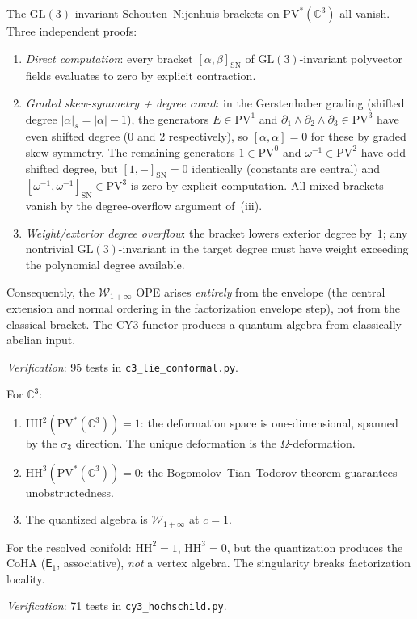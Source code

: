 \documentclass[11pt]{article}
\newcommand{\cW}{\mathcal{W}}
\newcommand{\C}{\mathbb{C}}
\newcommand{\Eone}{\mathsf{E}_1}
\newcommand{\HH}{\mathrm{HH}}
\begin{document}
\begin{theorem}
\label{wn:thm:c3-abelian-bracket}
The $\mathrm{GL}(3)$-invariant Schouten--Nijenhuis brackets on $\mathrm{PV}^*(\C^3)$ all vanish. Three independent proofs:
\begin{enumerate}[label=\textup{(\roman*)}]
 \item \emph{Direct computation}: every bracket $[\alpha, \beta]_{\mathrm{SN}}$ of $\mathrm{GL}(3)$-invariant polyvector fields evaluates to zero by explicit contraction.
 \item \emph{Graded skew-symmetry + degree count}: in the Gerstenhaber grading (shifted degree $|\alpha|_s = |\alpha| - 1$), the generators $E \in \mathrm{PV}^1$ and $\partial_1 \wedge \partial_2 \wedge \partial_3 \in \mathrm{PV}^3$ have even shifted degree ($0$ and $2$ respectively), so $[\alpha, \alpha] = 0$ for these by graded skew-symmetry. The remaining generators $1 \in \mathrm{PV}^0$ and $\omega^{-1} \in \mathrm{PV}^2$ have odd shifted degree, but $[1, -]_{\mathrm{SN}} = 0$ identically (constants are central) and $[\omega^{-1}, \omega^{-1}]_{\mathrm{SN}} \in \mathrm{PV}^3$ is zero by explicit computation. All mixed brackets vanish by the degree-overflow argument of~(iii).
 \item \emph{Weight/exterior degree overflow}: the bracket lowers exterior degree by~$1$; any nontrivial $\mathrm{GL}(3)$-invariant in the target degree must have weight exceeding the polynomial degree available.
\end{enumerate}
Consequently, the $\cW_{1+\infty}$ OPE arises \emph{entirely} from the envelope (the central extension and normal ordering in the factorization envelope step), not from the classical bracket. The CY3 functor produces a quantum algebra from classically abelian input.

\noindent\textit{Verification}: 95 tests in \texttt{c3\_lie\_conformal.py}.
\end{theorem}

\begin{theorem}
\label{wn:thm:c3-hochschild}
For $\C^3$:
\begin{enumerate}[label=\textup{(\roman*)}]
 \item $\HH^2(\mathrm{PV}^*(\C^3)) = 1$: the deformation space is one-dimensional, spanned by the $\sigma_3$ direction. The unique deformation is the $\Omega$-deformation.
 \item $\HH^3(\mathrm{PV}^*(\C^3)) = 0$: the Bogomolov--Tian--Todorov theorem guarantees unobstructedness.
 \item The quantized algebra is $\cW_{1+\infty}$ at $c = 1$.
\end{enumerate}
For the resolved conifold: $\HH^2 = 1$, $\HH^3 = 0$, but the quantization produces the CoHA ($\Eone$, associative), \emph{not} a vertex algebra. The singularity breaks factorization locality.

\noindent\textit{Verification}: 71 tests in \texttt{cy3\_hochschild.py}.
\end{theorem}
\end{document}
